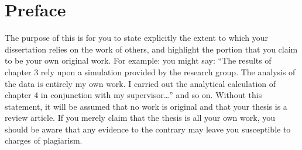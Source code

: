 \chapter*{Preface}

The purpose of this is for you to state explicitly the extent to which your dissertation relies on the work of others, and highlight the portion that you claim to be your own original work.  For example: you might say: “The results of chapter 3 rely upon a simulation provided by the research group.  The analysis of the data is entirely my own work.  I carried out the analytical calculation of chapter 4 in conjunction with my supervisor…” and so on. Without this statement, it will be assumed that no work is original and that your thesis is a review article.  If you merely claim that the thesis is all your own work, you should be aware that any evidence to the contrary may leave you susceptible to charges of plagiarism.

